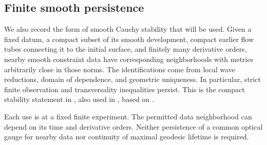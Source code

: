 \subsection{Finite smooth persistence}

We also record the form of smooth Cauchy stability that will be
used. Given a fixed datum, a compact subset of its smooth
development, compact earlier flow tubes connecting it to the
initial surface, and finitely many derivative orders, nearby
smooth constraint data have corresponding neighborhoods with
metrics arbitrarily close in those norms. The identifications
come from local wave reductions, domain of dependence, and
geometric uniqueness. In particular, strict finite observation
and transversality inequalities persist. This is the compact
stability statement in \cite[]{KerrCTwo}, also used
in \cite[]{KerrCOne}, based on
\cite{ChoquetBruhat1952,ChoquetBruhatGeroch1969}.

Each use is at a fixed finite experiment. The permitted data
neighborhood can depend on its time and derivative orders.
Neither persistence of a common optical gauge for nearby data
nor continuity of maximal geodesic lifetime is required.

